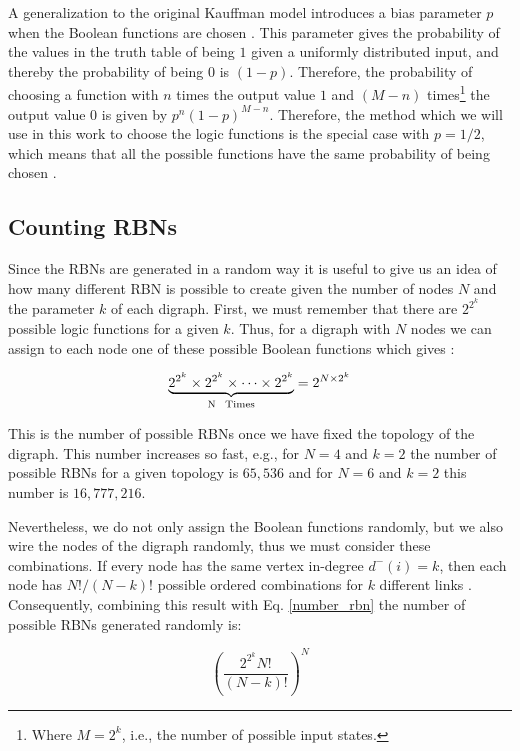 A generalization to the original Kauffman model introduces a bias parameter $p$ when the Boolean functions are chosen  \cite{attractors}. This parameter gives the probability of the values in the truth table of being $1$ given a uniformly distributed input, and thereby the probability of being $0$ is $(1-p)$. Therefore, the probability of choosing a function with $n$ times the output value $1$ and $(M-n)$ times\footnote{Where $M=2^{k}$, i.e., the number of possible input states.} the output value $0$ is given by $p^{n}(1-p)^{M-n}$. Therefore, the method which we will use in this work to choose the logic functions is the special case with $p=1/2$, which means that all the possible functions have the same probability of being chosen \cite{rbn_barbara}.

\subsection{Counting RBNs}
\label{Counting_RBN_section}
Since the RBNs are generated in a random way it is useful to give us an idea of how many different RBN is possible to create given the number of nodes $N$ and the parameter $k$ of each digraph. First, we must remember that there are $2^{2^{k}}$ possible logic functions for a given $k$. Thus, for a digraph with $N$ nodes we can assign to each node one of these possible Boolean functions which gives \cite{coding_boolean}:

\begin{equation}
\label{number_rbn}
\underbrace{2^{2^{k}} \times 2^{2^{k}} \times \cdots \times 2^{2^{k}}}_\text{N \, Times} =2^{N \times 2^{k}}
\end{equation}

This is the number of possible RBNs once we have fixed the topology of the digraph. This number increases so fast, e.g., for $N=4$ and $k=2$ the number of possible RBNs for a given topology is $65,536$ and for $N=6$ and $k=2$ this number is $16,777,216$.

Nevertheless, we do not only assign the Boolean functions randomly, but we also wire the nodes of the digraph randomly, thus we must consider these combinations. If every node has the same vertex in-degree $ d^{-} (i) =k$, then each node has $N!/(N-k)!$ possible ordered combinations for $k$ different links \cite{rbn_barbara}. Consequently, combining this result with Eq. \ref{number_rbn} the number of possible RBNs generated randomly is:

\begin{equation}
\label{number_rbn_final}
(\frac{2^{2^{k}} N!}{(N-k)!})^{N}
\end{equation}

